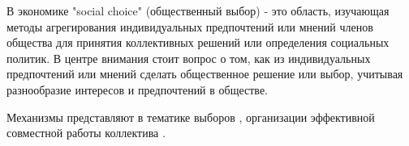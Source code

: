 В экономике "social choice" (общественный выбор) - это область, изучающая методы агрегирования индивидуальных предпочтений или мнений членов общества для принятия коллективных решений или определения социальных политик. \cite{arrow2012social} В центре внимания стоит вопрос о том, как из индивидуальных предпочтений или мнений сделать общественное решение или выбор, учитывая разнообразие интересов и предпочтений в обществе.

Механизмы представляют в тематике выборов \cite{gibbard1973manipulation}, организации эффективной совместной работы коллектива \cite{groves1973incentives}. 